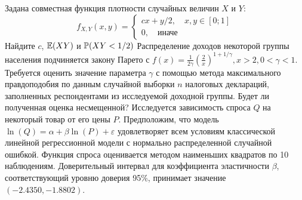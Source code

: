 \documentclass[addpoints, answers]{exam} %
\begin{document}
\begin{questions}
\question Задана совместная функция плотности случайных величин $X$ и $Y$:
\[
f_{X,Y}(x,y)=\left\{\begin{array}{c}
cx+y/2,\quad x,y\in [0;1] \\ 
0,\quad \mbox{иначе}
\end{array}  \right.
\]
Найдите $c$, $\E(XY)$ и $\P(XY<1/2)$
\question Распределение доходов некоторой группы населения подчиняется закону Парето с $f(x)=\frac{1}{2\gamma}\left(\frac{2}{x}\right)^{1+1/\gamma}, x>2, 0<\gamma<1$.
Требуется оценить значение параметра $\gamma$ с помощью метода максимального правдоподобия по данным случайной выборки $n$ налоговых деклараций, заполненных респондентами из исследуемой доходной группы. Будет ли полученная оценка несмещенной?
\question Исследуется зависимость спроса $Q$ на некоторый товар от его цены $P$. Предположим, что модель $\ln(Q)=\alpha+\beta\ln(P)+\varepsilon$ удовлетворяет всем условиям классической линейной регрессионной модели с нормально распределенной случайной ошибкой. Функция спроса оценивается методом наименьших квадратов по 10 наблюдениям. Доверительный интервал для коэффициента эластичности $\beta$, соответствующий уровню доверия 95\%, принимает значение $(-2.4350,-1.8802)$. 
\end{questions} 
\end{document}

